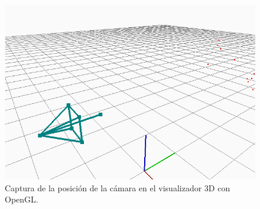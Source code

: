 \begin{figure}[th]
\centering
\includegraphics[scale=0.65]{Figures/camera-opengl.png}
\decoRule
\caption[Captura visualizador 3D]{Captura de la posición de la cámara en el visualizador 3D con OpenGL.}
\label{fig:OpenGL}
\end{figure}